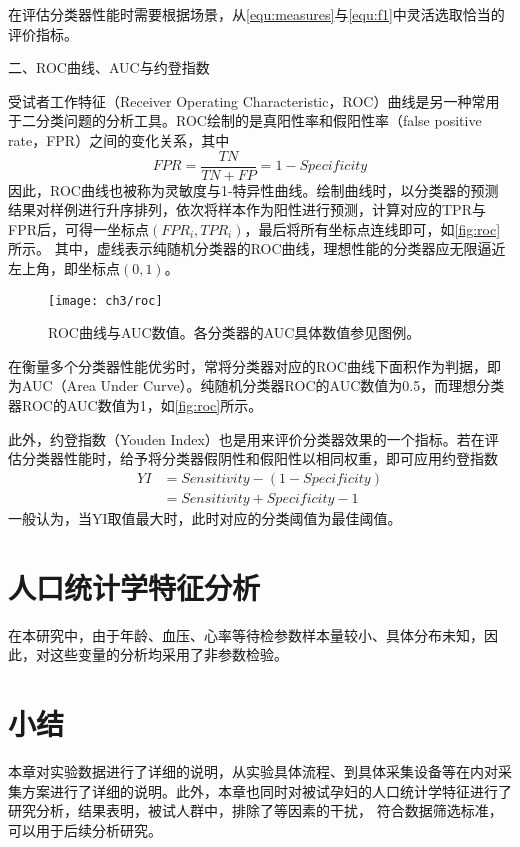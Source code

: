 在评估分类器性能时需要根据场景，从\autoref{equ:measures}与\autoref{equ:f1}中灵活选取恰当的评价指标。

二、ROC曲线、AUC与约登指数

受试者工作特征（Receiver Operating Characteristic，ROC）曲线是另一种常用于二分类问题的分析工具。ROC绘制的是真阳性率和假阳性率（false positive rate，FPR）之间的变化关系，其中
\begin{equation}
      \label{equ:fpr}
      FPR=\frac{TN}{TN+FP}=1-Specificity
\end{equation}
因此，ROC曲线也被称为灵敏度与1-特异性曲线。绘制曲线时，以分类器的预测结果对样例进行升序排列，依次将样本作为阳性进行预测，计算对应的TPR与FPR后，可得一坐标点$({FPR}_i,{TPR}_i)$，最后将所有坐标点连线即可，如\autoref{fig:roc}所示。
其中，虚线表示纯随机分类器的ROC曲线，理想性能的分类器应无限逼近左上角，即坐标点$(0,1)$。
\begin{figure}[htbp]
      \centering
      \texttt{[image: ch3/roc]}
      \caption[ROC曲线与AUC数值]{\label{fig:roc}ROC曲线与AUC数值。各分类器的AUC具体数值参见图例。}
\end{figure}

在衡量多个分类器性能优劣时，常将分类器对应的ROC曲线下面积作为判据，即为AUC（Area Under Curve）。纯随机分类器ROC的AUC数值为0.5，而理想分类器ROC的AUC数值为1，如\autoref{fig:roc}所示。

此外，约登指数（Youden Index）也是用来评价分类器效果的一个指标。若在评估分类器性能时，给予将分类器假阴性和假阳性以相同权重，即可应用约登指数
\begin{equation}
      \label{equ:yi}
      \begin{aligned}
            YI&=Sensitivity-(1-Specificity)\\
            &=Sensitivity+Specificity-1
      \end{aligned}
\end{equation}
一般认为，当YI取值最大时，此时对应的分类阈值为最佳阈值\cite{cwl}。

\section{人口统计学特征分析}
在本研究中，由于年龄、血压、心率等待检参数样本量较小、具体分布未知，因此，对这些变量的分析均采用了非参数检验。
\section{小结}
本章对实验数据进行了详细的说明，从实验具体流程、到具体采集设备等在内对采集方案进行了详细的说明。此外，本章也同时对被试孕妇的人口统计学特征进行了研究分析，结果表明，被试人群中，排除了等因素的干扰，
符合数据筛选标准，可以用于后续分析研究。  